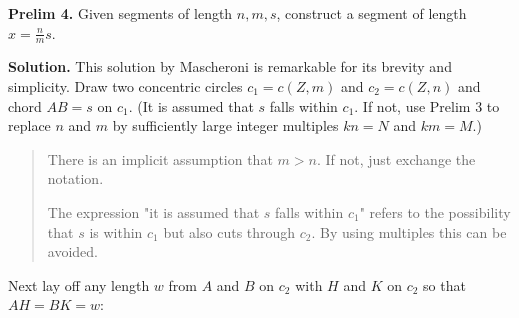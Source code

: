 \documentclass[11pt,a4paper]{article}
\begin{document}

\textbf{Prelim 4.} Given segments of length $n,m,s$, construct a segment of length $x = \frac{n}{m}s$.

\textbf{Solution.} This solution by Mascheroni is remarkable for its brevity and simplicity. Draw two concentric circles $c_1 = c(Z,m)$ and $c_2 = c(Z,n)$ and chord $AB = s$ on $c_1$. (It is assumed that $s$ falls within $c_1$. If not, use Prelim 3 to replace $n$ and $m$ by sufficiently large integer multiples $kn = N$ and $km = M$.)

\begin{quote}
There is an implicit assumption that $m>n$. If not, just exchange the notation.

The expression "it is assumed that $s$ falls within $c_1$" refers to the possibility that $s$ is within $c_1$ but also cuts through $c_2$. By using multiples this can be avoided.
\end{quote}

\begin{center}
\end{center}

Next lay off any length $w$ from $A$ and $B$ on $c_2$ with $H$ and $K$ on $c_2$ so that $AH = BK = w$:
\end{document}
